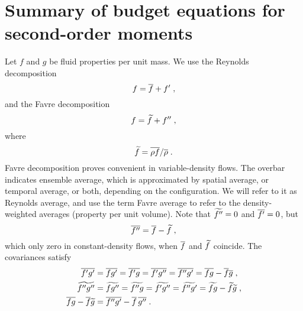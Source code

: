 \section{Summary of budget equations for second-order moments}

Let $f$ and $g$ be fluid properties per unit mass. We use the Reynolds decomposition
\begin{equation}
    f = \overline{f}+f' \;,
\end{equation}
and the Favre decomposition
\begin{equation}
    f = \widetilde{f}+f'' \;,
\end{equation}
where
\begin{equation}
    \widetilde{f} = \overline{\rho f}/\overline{\rho} \;.
\end{equation}
Favre decomposition proves convenient in variable-density flows. The overbar indicates ensemble average, which is approximated by spatial average, or temporal average, or both, depending on the  configuration. We will refer to it as Reynolds average, and use the term Favre average to refer to the density-weighted averages (property per unit volume). Note that $\widetilde{f''}=0$ and $\overline{f'}=0$, but
\begin{equation}
    \overline{f''}=\overline{f}-\widetilde{f} \;,
\end{equation}
which only zero in constant-density flows, when $\overline{f}$ and $\widetilde{f}$ coincide.
The covariances satisfy
\begin{align}
    \overline{f'g'}   &= \overline{fg'}  =\overline{f'g}  =\overline{f'g''} =\overline{f''g'} =\overline{fg}-\overline{f}\overline{g} \;,\\
    \widetilde{f''g''} &= \widetilde{fg''} =\widetilde{f''g} =\widetilde{f'g''} =\widetilde{f''g'} =\widetilde{fg}-\widetilde{f}\widetilde{g} \;,\\
    \overline{fg}-\overline{f}\widetilde{g} &=\overline{f''g'}-\overline{f}\,\overline{g''}\;.
\end{align}

